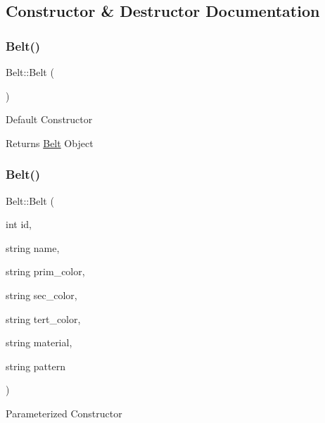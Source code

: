 \subsection{Constructor \& Destructor Documentation}
\mbox{\label{classBelt_a6dc40c21b5a62c71925df189511d7551}} 
\subsubsection{\texorpdfstring{Belt()}{Belt()}\hspace{0.1cm}{\footnotesize\ttfamily [1/2]}}
{\footnotesize\ttfamily Belt\+::\+Belt (\begin{DoxyParamCaption}{ }\end{DoxyParamCaption})}

Default Constructor

\begin{DoxyReturn}{Returns}
\mbox{\hyperlink{classBelt}{Belt}} Object 
\end{DoxyReturn}
\mbox{\label{classBelt_a2a8b481a0fe80916513dbd5cf1f03127}} 
\subsubsection{\texorpdfstring{Belt()}{Belt()}\hspace{0.1cm}{\footnotesize\ttfamily [2/2]}}
{\footnotesize\ttfamily Belt\+::\+Belt (\begin{DoxyParamCaption}\item[{int}]{id,  }\item[{string}]{name,  }\item[{string}]{prim\+\_\+color,  }\item[{string}]{sec\+\_\+color,  }\item[{string}]{tert\+\_\+color,  }\item[{string}]{material,  }\item[{string}]{pattern }\end{DoxyParamCaption})}

Parameterized Constructor


